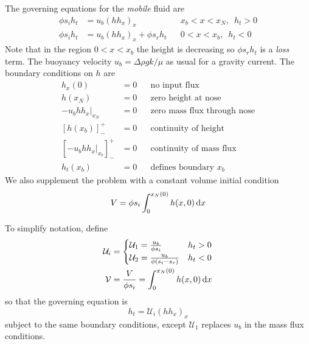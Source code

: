 \documentclass{jknotes}
\newcommand{\dif}[1]{\left[#1\right]^+_-}
\begin{document}
The governing equations for the \emph{mobile} fluid are
\begin{align}
	\phi s_i h_t &= u_b (h h_x)_x &&x_b < x < x_N, \,\,\, h_t > 0 \\
	\phi s_i h_t &= u_b (h h_x)_x + \phi s_r h_t  &&0 < x < x_b, \,\,\, h_t < 0
\end{align}
Note that in the region $0 < x < x_b$ the height is decreasing so $\phi s_r
h_t$ is a \emph{loss} term. The buoyancy velocity $u_b = \Delta \rho g k/\mu$
as usual for a gravity current. The boundary conditions on $h$ are
\begin{align}
	h_x(0) &= 0 &&\text{no input flux}\\
	h(x_N) &= 0 &&\text{zero height at nose}\\
	-u_b \left. h h_x \right|_{x_N} &= 0 &&\text{zero mass flux through nose} \\
	\dif{h(x_b)} &= 0 &&\text{continuity of height} \\
	\dif{-u_b \left. h h_x \right|_{x_b}} &= 0 &&\text{continuity of mass
	flux} \\
	h_t(x_b) &= 0 &&\text{defines boundary $x_b$}
\end{align}
We also supplement the problem with a constant volume initial condition
\begin{equation}
	V = \phi s_i \int_0^{x_N(0)} h(x,0) \, \diffd x
\end{equation}

To simplify notation, define
\begin{align}
	\mathcal{U}_i &= \begin{cases} \mathcal{U}_1 = \frac{u_b}{\phi s_i} & h_t
	> 0 \\ \mathcal{U}_2 = \frac{u_b}{\phi(s_i-s_r)} &h_t < 0 \end{cases} \\
	\mathcal{V} &= \frac{V}{\phi s_i} = \int_0^{x_N(0)} h(x,0) \, \diffd x
\end{align}
so that the governing equation is
\begin{equation}
	h_t = \mathcal{U}_i(hh_x)_x
\end{equation}
subject to the same boundary conditions, except $\mathcal{U}_1$ replaces $u_b$
in the mass flux conditions.
\end{document}
